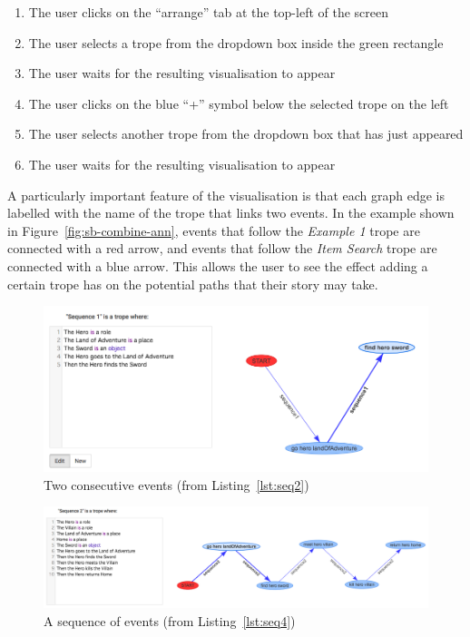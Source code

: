 \documentclass[11pt]{report}
\begin{document}
\begin{samepage}
\begin{enumerate}
  \item The user clicks on the ``arrange'' tab at the top-left of the screen
  \item The user selects a trope from the dropdown box inside the green rectangle
  \item The user waits for the resulting visualisation to appear
  \item The user clicks on the blue ``+'' symbol below the selected trope on the left
  \item The user selects another trope from the dropdown box that has just appeared
  \item The user waits for the resulting visualisation to appear
\end{enumerate}
\end{samepage}

A particularly important feature of the visualisation is that each graph edge is
labelled with the name of the trope that links two events. In the example
shown in Figure~\ref{fig:sb-combine-ann}, events that follow the \emph{Example
  1} trope are connected with a red arrow, and events that follow the \emph{Item
Search} trope are connected with a blue arrow. This allows the user to see
the effect adding a certain trope has on the potential paths that their story
may take.


\begin{figure}[!t]
\centerline{\includegraphics[width=\textwidth]{storybuilder-seq1.png}}
\caption{Two consecutive events (from Listing~\ref{lst:seq2})}\label{fig:sb-seq1}
\end{figure}

\begin{figure}[!t]
\centerline{\includegraphics[width=\textwidth]{storybuilder-seq2.png}}
\caption{A sequence of events (from Listing~\ref{lst:seq4})}\label{fig:sb-seq2}
\end{figure}
\end{document}
